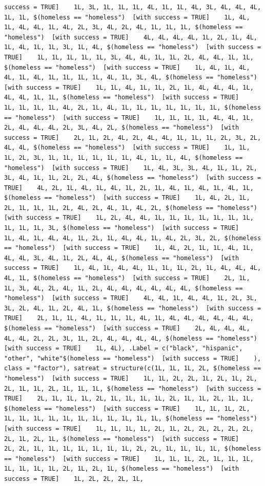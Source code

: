 \documentclass{tufte-book}\usepackage[]{graphicx}\usepackage[]{xcolor}
\makeatletter
\newenvironment{kframe}{%
 \def\at@end@of@kframe{}%
 \ifinner\ifhmode%
  \def\at@end@of@kframe{\end{minipage}}%
  \begin{minipage}{\columnwidth}%
 \fi\fi%
 \def\FrameCommand##1{\hskip\@totalleftmargin \hskip-\fboxsep
 \colorbox{shadecolor}{##1}\hskip-\fboxsep
     \hskip-\linewidth \hskip-\@totalleftmargin \hskip\columnwidth}%
 \MakeFramed {\advance\hsize-\width
   \@totalleftmargin\z@ \linewidth\hsize
   \@setminipage}}%
 {\par\unskip\endMakeFramed%
 \at@end@of@kframe}
\newenvironment{knitrout}{}{} %
\makeatother
\begin{document}
\begin{knitrout}
\begin{kframe}
\begin{verbatim}
success = TRUE]    1L, 3L, 1L, 1L, 1L, 4L, 1L, 1L, 4L, 3L, 4L, 4L, 4L, 1L, 1L, $(homeless == "homeless")  [with success = TRUE]    1L, 4L, 1L, 4L, 4L, 1L, 4L, 2L, 3L, 4L, 2L, 4L, 1L, 1L, 1L, $(homeless == "homeless")  [with success = TRUE]    4L, 4L, 4L, 4L, 1L, 2L, 1L, 4L, 1L, 4L, 1L, 1L, 3L, 1L, 4L, $(homeless == "homeless")  [with success = TRUE]    1L, 1L, 1L, 1L, 1L, 3L, 4L, 4L, 1L, 1L, 2L, 4L, 4L, 1L, 1L, $(homeless == "homeless")  [with success = TRUE]    1L, 4L, 1L, 4L, 4L, 1L, 4L, 1L, 1L, 1L, 1L, 4L, 1L, 3L, 4L, $(homeless == "homeless")  [with success = TRUE]    1L, 1L, 4L, 1L, 1L, 2L, 1L, 4L, 4L, 4L, 1L, 4L, 4L, 1L, 1L, $(homeless == "homeless")  [with success = TRUE]    1L, 1L, 1L, 1L, 4L, 2L, 1L, 4L, 1L, 1L, 1L, 1L, 1L, 1L, 1L, $(homeless == "homeless")  [with success = TRUE]    1L, 1L, 1L, 1L, 4L, 4L, 1L, 2L, 4L, 4L, 4L, 2L, 3L, 4L, 2L, $(homeless == "homeless")  [with success = TRUE]    2L, 1L, 2L, 4L, 2L, 4L, 4L, 1L, 1L, 1L, 2L, 3L, 2L, 4L, 4L, $(homeless == "homeless")  [with success = TRUE]    1L, 1L, 1L, 2L, 3L, 1L, 1L, 1L, 1L, 1L, 1L, 4L, 1L, 1L, 4L, $(homeless == "homeless")  [with success = TRUE]    1L, 4L, 3L, 3L, 4L, 1L, 1L, 2L, 3L, 4L, 1L, 1L, 2L, 2L, 4L, $(homeless == "homeless")  [with success = TRUE]    4L, 2L, 1L, 4L, 1L, 4L, 1L, 2L, 1L, 4L, 1L, 4L, 1L, 4L, 1L, $(homeless == "homeless")  [with success = TRUE]    1L, 4L, 2L, 1L, 2L, 1L, 1L, 1L, 2L, 4L, 2L, 4L, 1L, 4L, 2L, $(homeless == "homeless")  [with success = TRUE]    1L, 2L, 4L, 4L, 1L, 1L, 1L, 1L, 1L, 1L, 1L, 1L, 1L, 1L, 3L, $(homeless == "homeless")  [with success = TRUE]    1L, 4L, 1L, 4L, 4L, 1L, 2L, 1L, 4L, 4L, 1L, 4L, 2L, 3L, 2L, $(homeless == "homeless")  [with success = TRUE]    1L, 4L, 2L, 1L, 1L, 4L, 1L, 4L, 4L, 3L, 4L, 1L, 2L, 4L, 4L, $(homeless == "homeless")  [with success = TRUE]    1L, 4L, 1L, 4L, 4L, 1L, 1L, 1L, 2L, 1L, 4L, 4L, 4L, 4L, 1L, $(homeless == "homeless")  [with success = TRUE]    2L, 1L, 1L, 3L, 4L, 2L, 4L, 1L, 2L, 4L, 4L, 4L, 4L, 4L, 4L, $(homeless == "homeless")  [with success = TRUE]    4L, 4L, 1L, 4L, 4L, 1L, 2L, 3L, 3L, 2L, 4L, 1L, 2L, 4L, 1L, $(homeless == "homeless")  [with success = TRUE]    2L, 1L, 1L, 4L, 1L, 1L, 1L, 4L, 1L, 4L, 4L, 4L, 4L, 4L, 4L, $(homeless == "homeless")  [with success = TRUE]    2L, 4L, 4L, 4L, 4L, 4L, 2L, 2L, 3L, 1L, 2L, 4L, 4L, 4L, 4L, $(homeless == "homeless")  [with success = TRUE]    1L, 4L), .Label = c("black", "hispanic", "other", "white"$(homeless == "homeless")  [with success = TRUE]    ), class = "factor"), satreat = structure(c(1L, 1L, 1L, 2L, $(homeless == "homeless")  [with success = TRUE]    1L, 1L, 2L, 2L, 1L, 2L, 1L, 2L, 2L, 1L, 1L, 2L, 1L, 1L, 1L, $(homeless == "homeless")  [with success = TRUE]    2L, 1L, 1L, 1L, 2L, 1L, 1L, 1L, 1L, 2L, 1L, 1L, 2L, 1L, 1L, $(homeless == "homeless")  [with success = TRUE]    1L, 1L, 1L, 2L, 1L, 1L, 1L, 1L, 1L, 1L, 1L, 1L, 1L, 1L, 1L, $(homeless == "homeless")  [with success = TRUE]    1L, 1L, 1L, 1L, 2L, 1L, 2L, 2L, 2L, 2L, 2L, 2L, 1L, 2L, 1L, $(homeless == "homeless")  [with success = TRUE]    2L, 2L, 1L, 1L, 1L, 1L, 1L, 1L, 1L, 2L, 2L, 1L, 1L, 1L, 1L, $(homeless == "homeless")  [with success = TRUE]    1L, 1L, 1L, 2L, 1L, 1L, 1L, 1L, 1L, 1L, 1L, 2L, 1L, 2L, 1L, $(homeless == "homeless")  [with success = TRUE]    1L, 2L, 2L, 2L, 1L, 
\end{verbatim}
\end{kframe}
\end{knitrout}
\end{document}
